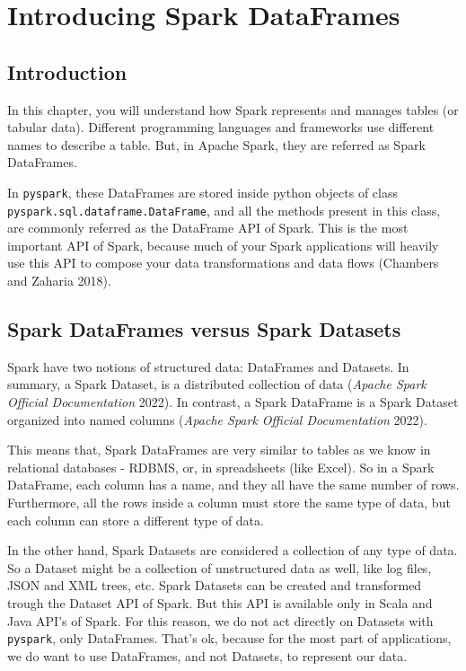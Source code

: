 \documentclass[
  11pt,
  letterpaper,
  DIV=11,
  numbers=noendperiod]{scrreprt}
\begin{document}

\hypertarget{sec-dataframes-chapter}{%
\chapter{Introducing Spark DataFrames}\label{sec-dataframes-chapter}}

\hypertarget{introduction-3}{%
\section{Introduction}\label{introduction-3}}

In this chapter, you will understand how Spark represents and manages
tables (or tabular data). Different programming languages and frameworks
use different names to describe a table. But, in Apache Spark, they are
referred as Spark DataFrames.

In \texttt{pyspark}, these DataFrames are stored inside python objects
of class \texttt{pyspark.sql.dataframe.DataFrame}, and all the methods
present in this class, are commonly referred as the DataFrame API of
Spark. This is the most important API of Spark, because much of your
Spark applications will heavily use this API to compose your data
transformations and data flows (Chambers and Zaharia 2018).

\hypertarget{spark-dataframes-versus-spark-datasets}{%
\section{Spark DataFrames versus Spark
Datasets}\label{spark-dataframes-versus-spark-datasets}}

Spark have two notions of structured data: DataFrames and Datasets. In
summary, a Spark Dataset, is a distributed collection of data
(\emph{Apache Spark Official Documentation} 2022). In contrast, a Spark
DataFrame is a Spark Dataset organized into named columns (\emph{Apache
Spark Official Documentation} 2022).

This means that, Spark DataFrames are very similar to tables as we know
in relational databases - RDBMS, or, in spreadsheets (like Excel). So in
a Spark DataFrame, each column has a name, and they all have the same
number of rows. Furthermore, all the rows inside a column must store the
same type of data, but each column can store a different type of data.

In the other hand, Spark Datasets are considered a collection of any
type of data. So a Dataset might be a collection of unstructured data as
well, like log files, JSON and XML trees, etc. Spark Datasets can be
created and transformed trough the Dataset API of Spark. But this API is
available only in Scala and Java API's of Spark. For this reason, we do
not act directly on Datasets with \texttt{pyspark}, only DataFrames.
That's ok, because for the most part of applications, we do want to use
DataFrames, and not Datasets, to represent our data.
\end{document}
